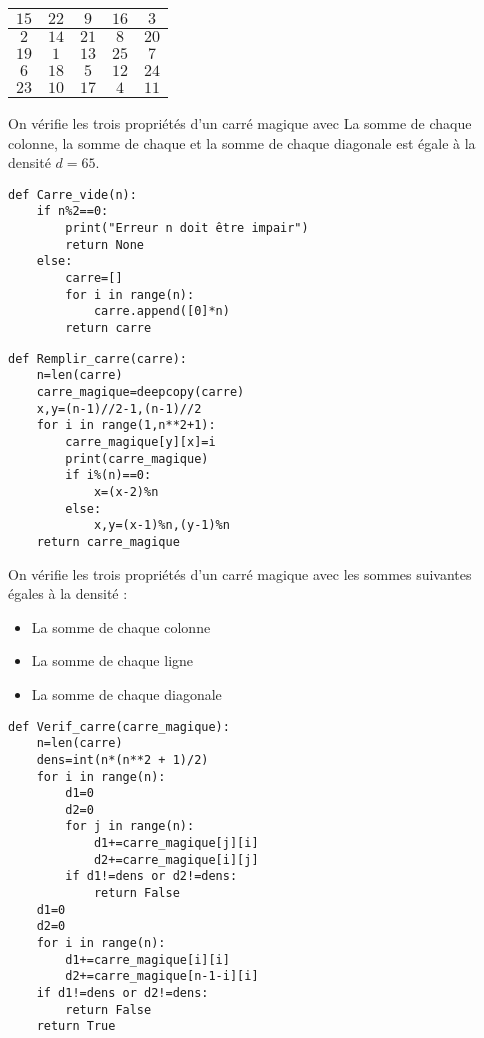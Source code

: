 \question{}

\renewcommand{\arraystretch}{1.2}
		\begin{tabular}{|*{5}{c|}}
			\hline
			$15$ & $22$ & $9$ & $16$ &$~3~$\\
			\hline
			$~2~$& $14$ & $21$ & $8$ & $20$ \\
			\hline
			 $19$  &$~1~$& $13$  & $25$  & $7$   \\
			\hline
			$~6~$& $18$ &$~5~$& $12$ & $24$ \\
			\hline
			 $23$ & $10$ & $17$ &$~4~$& $11$ \\
			\hline
		\end{tabular}
\renewcommand{\arraystretch}{1}

On vérifie les trois propriétés d'un carré magique avec La somme de chaque colonne, la somme de chaque et la somme de chaque diagonale est égale à la densité $d=65$.

\question{}

\begin{lstlisting}
def Carre_vide(n):
    if n%2==0:
        print("Erreur n doit être impair")
        return None
    else:
        carre=[]
        for i in range(n):
            carre.append([0]*n)
        return carre
\end{lstlisting}


\question{}

\begin{lstlisting}
def Remplir_carre(carre):
    n=len(carre)
    carre_magique=deepcopy(carre)
    x,y=(n-1)//2-1,(n-1)//2
    for i in range(1,n**2+1):
        carre_magique[y][x]=i
        print(carre_magique)
        if i%(n)==0:
            x=(x-2)%n
        else:
            x,y=(x-1)%n,(y-1)%n
    return carre_magique
\end{lstlisting}


\question{}

On vérifie les trois propriétés d'un carré magique avec les sommes suivantes égales à la densité :
\begin{itemize}
\item La somme de chaque colonne
\item La somme de chaque ligne
\item La somme de chaque diagonale
\end{itemize}

\begin{lstlisting}
def Verif_carre(carre_magique):
    n=len(carre)
    dens=int(n*(n**2 + 1)/2)
    for i in range(n):
        d1=0
        d2=0
        for j in range(n):
            d1+=carre_magique[j][i]
            d2+=carre_magique[i][j]
        if d1!=dens or d2!=dens:
            return False
    d1=0
    d2=0
    for i in range(n):
        d1+=carre_magique[i][i]
        d2+=carre_magique[n-1-i][i]
    if d1!=dens or d2!=dens:
        return False
    return True
\end{lstlisting}